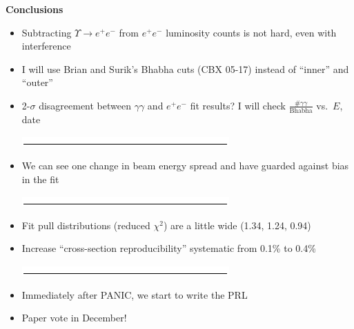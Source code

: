 \documentclass[landscape]{article}
\newenvironment{slide}[1][ ]{\mbox{\boldmath \bf #1 } \vfill}{\vfill \mbox{ } \pagebreak}
\begin{document}
\begin{slide}[Conclusions]

\begin{itemize}\setlength{\itemsep}{0.6 cm}

  \item Subtracting $\Upsilon \to e^+e^-$ from $e^+e^-$ luminosity counts is not hard, even with interference

  \item I will use Brian and Surik's Bhabha cuts (CBX 05-17) instead of ``inner'' and ``outer''

  \item 2-$\sigma$ disagreement between $\gamma\gamma$ and $e^+e^-$ fit results?  I will check $\displaystyle \frac{\#\gamma\gamma}{\mbox{Bhabha}}$ vs.\ $E$, date

  \begin{center}
    \includegraphics[width=0.8\linewidth]{justaline}
  \end{center}

  \item We can see one change in beam energy spread and have guarded against bias in the fit

  \begin{center}
    \includegraphics[width=0.8\linewidth]{justaline}
  \end{center}

  \item Fit pull distributions (reduced $\chi^2$) are a little wide (1.34, 1.24, 0.94)

  \item Increase ``cross-section reproducibility'' systematic from 0.1\% to 0.4\%

  \begin{center}
    \includegraphics[width=0.8\linewidth]{justaline}
  \end{center}

  \item Immediately after PANIC, we start to write the PRL

  \item Paper vote in December!

\end{itemize}

\end{slide}
\end{document}

